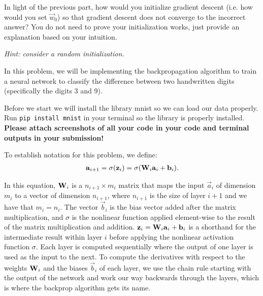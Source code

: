 \documentclass[preview]{standalone}
\begin{document}
\begin{Parts}
\Part In light of the previous part, how would you initialize gradient descent
(i.e. how would you set $\vec{w}_0$) so that gradient descent does not converge
to the incorrect answer? You do not need to prove your initialization works, just
provide an explanation based on your intuition.

\emph{Hint: consider a random initialization.}



\end{Parts}

%

In this problem, we will be implementing the backpropagation algorithm to train a neural network to classify the difference between two handwritten digits (specifically the digits 3 and 9).

Before we start we will install the library mnist so we can load our data properly.\\
Run \verb|pip install mnist| in your terminal so the library is properly installed. \\
\textbf{Please attach screenshots of all your code in your code and terminal outputs in your submission!}

To establish notation for this problem, we define:
\begin{align*}
\boldsymbol{\mathbf{a}}_{i+1} = \sigma(\boldsymbol{\mathbf{z}}_i) = \sigma(\mathbf{W}_i\boldsymbol{\mathbf{a}}_i+\boldsymbol{\mathbf{b}}_i).
\end{align*}

In this equation, $\mathbf{W}_i$ is a $n_{i+1}\times m_i$ matrix that maps the input $\vec a_i$ of dimension $m_i$ to a vector of dimension $n_{i+1}$, where $n_{i+1}$ is the size of layer $i+1$ and we have that $m_i=n_{i}$.  The vector $\vec{b}_i$ is the bias vector added after the matrix multiplication, and $\sigma$ is the nonlinear function applied element-wise to the result of the matrix multiplication and addition.  $\boldsymbol{\mathbf{z}}_i = \mathbf{W}_i\boldsymbol{\mathbf{a}}_i +\boldsymbol{\mathbf{b}}_i$ is a shorthand for the intermediate result within layer $i$ before applying the nonlinear activation function $\sigma$. Each layer is computed sequentially where the output of one layer is used as the input to the next.  To compute the derivatives with respect to the weights $\mathbf{W}_i$ and the biases $\vec{b}_i$ of each layer, we use the chain rule starting with the output of the network and work our way backwards through the layers, which is where the backprop algorithm gets its name.
\end{document}
